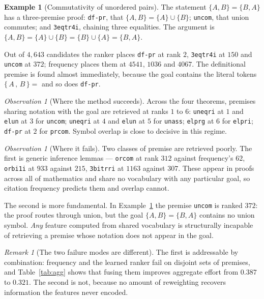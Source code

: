 \documentclass[11pt]{article}
\theoremstyle{plain}
\theoremstyle{definition}
\newtheorem{example}[theorem]{Example}
\theoremstyle{remark}
\newtheorem{remark}[theorem]{Remark}
\newtheorem{observation}[theorem]{Observation}
\begin{document}
\begin{example}[Commutativity of unordered pairs]\label{ex:prcom}
The statement $\{A,B\}=\{B,A\}$ has a three-premise proof: \texttt{df-pr}, that
$\{A,B\}=\{A\}\cup\{B\}$; \texttt{uncom}, that union commutes; and
\texttt{3eqtr4i}, chaining three equalities. The argument is
$\{A,B\}=\{A\}\cup\{B\}=\{B\}\cup\{A\}=\{B,A\}$.

Out of $4{,}643$ candidates the ranker places \texttt{df-pr} at rank $2$,
\texttt{3eqtr4i} at $150$ and \texttt{uncom} at $372$; frequency places them at
$4541$, $1036$ and $4067$. The definitional premise is found almost immediately,
because the goal contains the literal tokens $\{\,A\,,\,B\,\}=$ and so does
\texttt{df-pr}.
\end{example}

\begin{observation}[Where the method succeeds]\label{obs:succeed}
Across the four theorems, premises sharing notation with the goal are retrieved
at ranks $1$ to $6$: \texttt{uneqri} at $1$ and \texttt{elun} at $3$ for
\texttt{uncom}; \texttt{uneqri} at $4$ and \texttt{elun} at $5$ for
\texttt{unass}; \texttt{elprg} at $6$ for \texttt{elpri}; \texttt{df-pr} at $2$
for \texttt{prcom}. Symbol overlap is close to decisive in this regime.
\end{observation}

\begin{observation}[Where it fails]\label{obs:fail}
Two classes of premise are retrieved poorly. The first is generic inference
lemmas --- \texttt{orcom} at rank $312$ against frequency's $62$, \texttt{orbi1i}
at $933$ against $215$, \texttt{3bitrri} at $1163$ against $307$. These appear in
proofs across all of mathematics and share no vocabulary with any particular
goal, so citation frequency predicts them and overlap cannot.

The second is more fundamental. In Example~\ref{ex:prcom} the premise
\texttt{uncom} is ranked $372$: the proof routes through union, but the goal
$\{A,B\}=\{B,A\}$ contains no union symbol. \emph{Any} feature computed from
shared vocabulary is structurally incapable of retrieving a premise whose
notation does not appear in the goal.
\end{observation}

\begin{remark}[The two failure modes are different]
The first is addressable by combination: frequency and the learned ranker fail
on disjoint sets of premises, and Table~\ref{tab:agg} shows that fusing them
improves aggregate effort from $0.387$ to $0.321$. The second is not, because no
amount of reweighting recovers information the features never encoded.
\end{remark}
\end{document}
